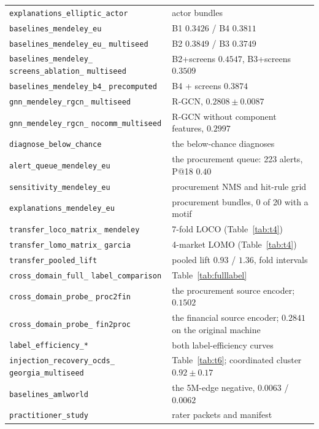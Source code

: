 \documentclass[conference]{IEEEtran}
\begin{document}
\begin{table}[tp]
\begin{tabular}{p{}p{}}
\texttt{explanations\_elliptic\_actor} & actor bundles \\
\texttt{baselines\_mendeley\_eu} & B1 $0.3426$ / B4 $0.3811$ \\
\texttt{baselines\_mendeley\_eu\_} \texttt{multiseed} & B2 $0.3849$ / B3 $0.3749$ \\
\texttt{baselines\_mendeley\_} \texttt{screens\_ablation\_} \texttt{multiseed} & B2+screens $0.4547$, B3+screens $0.3509$ \\
\texttt{baselines\_mendeley\_b4\_} \texttt{precomputed} & B4 + screens $0.3874$ \\
\texttt{gnn\_mendeley\_rgcn\_} \texttt{multiseed} & R-GCN, $0.2808 \pm 0.0087$ \\
\texttt{gnn\_mendeley\_rgcn\_} \texttt{nocomm\_multiseed} & R-GCN without component features, $0.2997$ \\
\texttt{diagnose\_below\_chance} & the below-chance diagnoses \\
\texttt{alert\_queue\_mendeley\_eu} & the procurement queue: 223 alerts, P@18 $0.40$ \\
\texttt{sensitivity\_mendeley\_eu} & procurement NMS and hit-rule grid \\
\texttt{explanations\_mendeley\_eu} & procurement bundles, 0 of 20 with a motif \\
\texttt{transfer\_loco\_matrix\_} \texttt{mendeley} & 7-fold LOCO (Table~\ref{tab:t4}) \\
\texttt{transfer\_lomo\_matrix\_} \texttt{garcia} & 4-market LOMO (Table~\ref{tab:t4}) \\
\texttt{transfer\_pooled\_lift} & pooled lift $0.93$ / $1.36$, fold intervals \\
\texttt{cross\_domain\_full\_} \texttt{label\_comparison} & Table~\ref{tab:fulllabel} \\
\texttt{cross\_domain\_probe\_} \texttt{proc2fin} & the procurement source encoder; $0.1502$ \\
\texttt{cross\_domain\_probe\_} \texttt{fin2proc} & the financial source encoder; $0.2841$ on the original machine \\
\texttt{label\_efficiency\_*} & both label-efficiency curves \\
\texttt{injection\_recovery\_ocds\_} \texttt{georgia\_multiseed} & Table~\ref{tab:t6}; coordinated cluster $0.92 \pm 0.17$ \\
\texttt{baselines\_amlworld} & the 5M-edge negative, $0.0063$ / $0.0062$ \\
\texttt{practitioner\_study} & rater packets and manifest \\
\bottomrule
\end{tabular}
\end{table}
\end{document}
